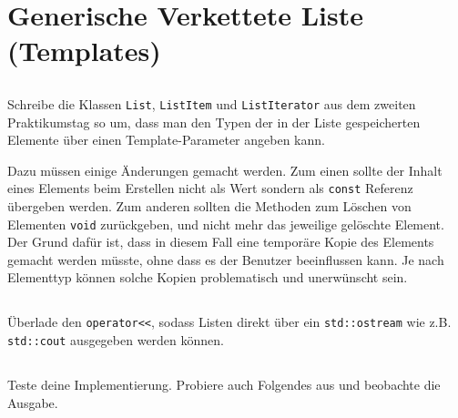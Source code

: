\section{\ExercisePrefixAdvanced Generische Verkettete Liste (Templates)}
\label{sec:list}
\label{sec:genericLinkedList}
\subsection{}
Schreibe die Klassen \lstinline{List}, \lstinline{ListItem} und \lstinline{ListIterator} aus dem zweiten Praktikumstag so um, dass man den Typen der in der Liste gespeicherten Elemente über einen Template-Parameter angeben kann.

Dazu müssen einige Änderungen gemacht werden.
Zum einen sollte der Inhalt eines Elements beim Erstellen nicht als Wert sondern als \lstinline{const} Referenz übergeben werden.
Zum anderen sollten die Methoden zum Löschen von Elementen \lstinline{void} zurückgeben, und nicht mehr das jeweilige gelöschte Element. Der Grund dafür ist, dass in diesem Fall eine temporäre Kopie des Elements gemacht werden müsste, ohne dass es der Benutzer beeinflussen kann.
Je nach Elementtyp können solche Kopien problematisch und unerwünscht sein.


\subsection{}
Überlade den \lstinline{operator<<}, sodass Listen direkt über ein \lstinline{std::ostream} wie z.B. \lstinline{std::cout} ausgegeben werden können.

\subsection{}
Teste deine Implementierung.
Probiere auch Folgendes aus und beobachte die Ausgabe.


